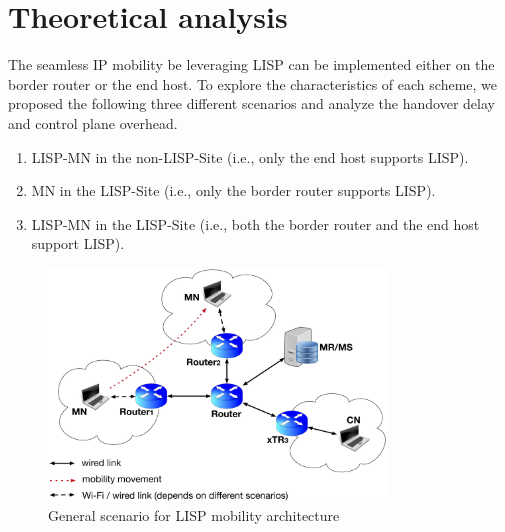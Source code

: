 \section{Theoretical analysis}
\label{sec:ns3_analysis}
The seamless IP mobility be leveraging LISP can be implemented either on the border router or the end host. To explore the characteristics of each scheme, we proposed the following three different scenarios and analyze the handover delay and control plane overhead.
\begin{enumerate}[noitemsep,topsep=0pt]
	\item LISP-MN in the non-LISP-Site (i.e., only the end host supports LISP). 
	\item MN in the LISP-Site (i.e., only the border router supports LISP). 
	\item LISP-MN in the LISP-Site (i.e., both the border router and the end host support LISP). 
\end{enumerate}	
\begin{figure}[!th]
	\centering
	\includegraphics[width=0.8\textwidth]{Pics/LISP_mobility_archi}
	\caption{General scenario for LISP mobility architecture}
	\label{sim_archi}
\end{figure}


